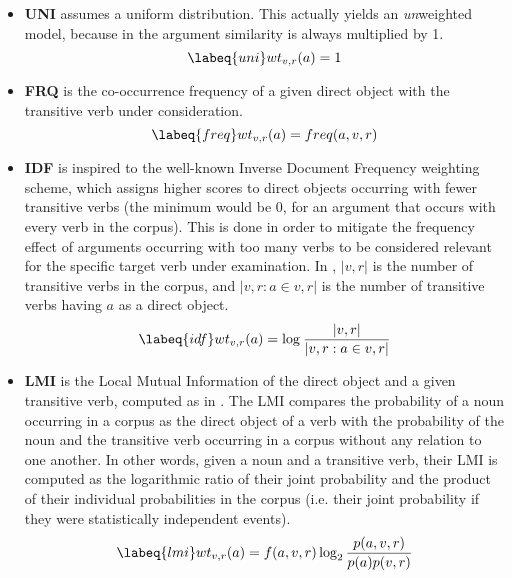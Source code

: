 \begin{itemize}

\item \textbf{UNI} assumes a uniform distribution. This actually yields an \textit{un}weighted model, because in  the argument similarity is always multiplied by 1.
\begin{equation} \labeq{uni}
wt_{v,r}(a) = 1
\end{equation}

\item \textbf{FRQ} is the co-occurrence frequency of a given direct object with the transitive verb under consideration.
\begin{equation} \labeq{freq}
wt_{v,r}(a) = freq(a,v,r)
\end{equation}

\item \textbf{IDF} is inspired to the well-known Inverse Document Frequency weighting scheme, which
assigns higher scores to direct objects occurring with fewer transitive verbs (the minimum would be 0, for an argument that occurs with every verb in the corpus). This is done in order to mitigate the frequency effect of arguments occurring with too many verbs to be considered relevant for the specific target verb under examination. In , $|v,r|$ is the number of transitive verbs in the corpus, and $|v,r : a \in v,r|$ is the number of transitive verbs having $a$ as a direct object.
 \begin{equation} \labeq{idf}
wt_{v,r}(a) = \log _{} \frac{|v,r|}{|v,r : a \in v,r|}
\end{equation}

\item \textbf{LMI} is the Local Mutual Information \parencite[89]{evert2005statistics-lmi} of the direct object and a given transitive verb, computed as in . The LMI compares the probability of a noun occurring in a corpus as the direct object of a verb with the probability of the noun and the transitive verb occurring in a corpus without any relation to one another. In other words, given a noun and a transitive verb, their LMI is computed as the logarithmic ratio of their joint probability and the product of their individual probabilities in the corpus (i.e. their joint probability if they were statistically independent events).
 \begin{equation} \labeq{lmi}
wt_{v,r}(a) = f(a,v,r) \log _{2} \frac{p(a,v,r)}{p(a)p(v,r)}
\end{equation}  


\end{itemize}
